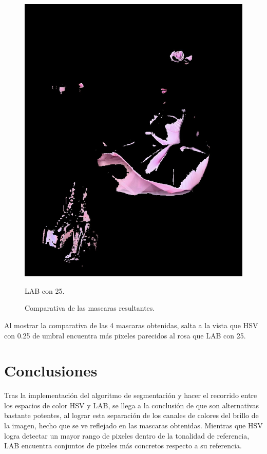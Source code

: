 \documentclass[11pt, letterpaper]{article}
\begin{document}
\begin{figure}[h!]
\begin{minipage}{0.4\textwidth}
		\includegraphics[width=\textwidth]{IMG/R43.jpg}
		\caption*{LAB con 25.}
	\end{minipage}
	\caption{Comparativa de las mascaras resultantes.}
	\label{fig:f6}
\end{figure}

Al mostrar la comparativa de las 4 mascaras obtenidas, salta a la vista que HSV con 0.25 de umbral encuentra más pixeles parecidos al rosa que LAB con 25.


\newpage
	
\section{Conclusiones}

Tras la implementación del algoritmo de segmentación y hacer el recorrido entre los espacios de color HSV y LAB, se llega a la conclusión de que son alternativas bastante potentes, al lograr esta separación de los canales de colores del brillo de la imagen, hecho que se ve reflejado en las mascaras obtenidas. Mientras que HSV logra detectar un mayor rango de pixeles dentro de la tonalidad de referencia, LAB encuentra conjuntos de pixeles más concretos respecto a su referencia.
\end{document}
